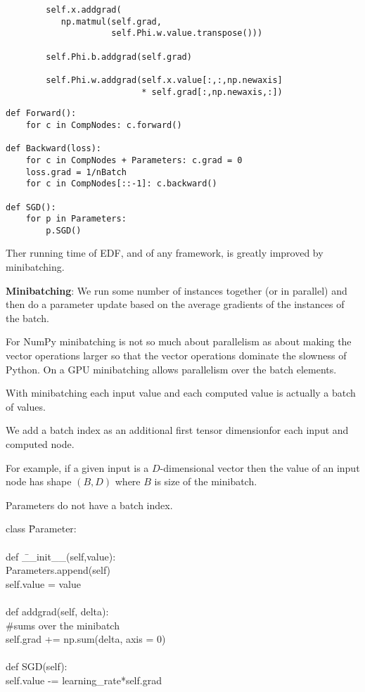 {\begin{verbatim}
        self.x.addgrad(
           np.matmul(self.grad,
                     self.Phi.w.value.transpose()))

        self.Phi.b.addgrad(self.grad)

        self.Phi.w.addgrad(self.x.value[:,:,np.newaxis]
                           * self.grad[:,np.newaxis,:])
\end{verbatim}


\begin{verbatim}
def Forward():
    for c in CompNodes: c.forward()

def Backward(loss):
    for c in CompNodes + Parameters: c.grad = 0
    loss.grad = 1/nBatch
    for c in CompNodes[::-1]: c.backward()

def SGD():
    for p in Parameters:
        p.SGD()
\end{verbatim}
\vfill


Ther running time of EDF, and of any framework, is greatly improved by minibatching.

 \vfill
{\bf Minibatching}: We run some number of instances together (or in parallel) and then do a parameter update based on the average
gradients of the instances of the batch.

\vfill
For NumPy minibatching is not so much about parallelism as about making the vector operations larger so that the vector operations dominate
the slowness of Python.  On a GPU minibatching allows parallelism over the batch elements.
\vfill

\vfill
With minibatching each input value and each computed value is actually a batch of values.

\vfill
We add a batch index as an additional first tensor dimensionfor each input and computed node.

\vfill
For example, if a given input is a $D$-dimensional vector then the value of an input node
has shape $(B,D)$ where $B$ is size of the minibatch.

\vfill
Parameters do not have a batch index.

\vfill
\eject
\vfill
\begin{tabbing}
class \=Parameter: \\
    \\
    \>def \=\_\_init\_\_(self,value): \\
        \>\>Parameters.append(self) \\
        \>\>self.value = value \\
\\
    \>def \>addgrad(self, delta): \\
          \>\>\#sums over the minibatch \\
    \>\>self.grad += np.sum(delta, axis = 0) \\
    \\
    \>def \>SGD(self): \\
    \>\>self.value -= learning\_rate*self.grad
\end{tabbing}

}
